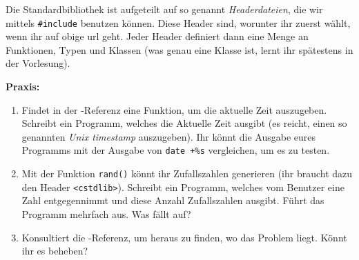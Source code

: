 Die Standardbibliothek ist aufgeteilt auf so genannt \emph{Headerdateien}, die
wir mittels \texttt{\#include} benutzen können. Diese Header sind, worunter ihr
zuerst wählt, wenn ihr auf obige url geht. Jeder Header definiert dann eine
Menge an Funktionen, Typen und Klassen (was genau eine Klasse ist, lernt ihr
spätestens in der Vorlesung).

\textbf{Praxis:}
\begin{enumerate}
    \item Findet in der \Cpp-Referenz eine Funktion, um die aktuelle Zeit
        auszugeben. Schreibt ein Programm, welches die Aktuelle Zeit ausgibt
        (es reicht, einen so genannten \emph{Unix timestamp} auszugeben). Ihr
        könnt die Ausgabe eures Programms mit der Ausgabe von \texttt{date
        +\%s} vergleichen, um es zu testen.
    \item Mit der Funktion \texttt{rand()} könnt ihr Zufallszahlen generieren
        (ihr braucht dazu den Header \texttt{<cstdlib>}). Schreibt ein
        Programm, welches vom Benutzer eine Zahl entgegennimmt und diese Anzahl
        Zufallszahlen ausgibt. Führt das Programm mehrfach aus. Was fällt auf?
    \item Konsultiert die \Cpp-Referenz, um heraus zu finden, wo das Problem
        liegt. Könnt ihr es beheben?
\end{enumerate}
